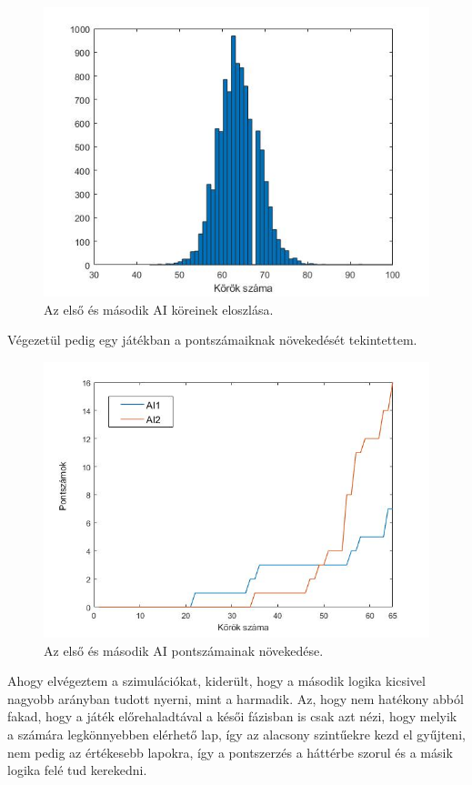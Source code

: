 \begin{figure}[h]
\centering
\includegraphics[scale=0.5]{images/round_number_hist_AI1vsAI2.jpg}
\caption{Az első és második AI köreinek eloszlása.}
\label{fig:rounds1v2}
\end{figure}

Végezetül pedig egy játékban a pontszámaiknak növekedését tekintettem.
\begin{figure}[h]
\centering
\includegraphics[scale=0.5]{images/player_points_AI1vsAI2.jpg}
\caption{Az első és második AI pontszámainak növekedése.}
\label{fig:player_scores1v2}
\end{figure}



Ahogy elvégeztem a szimulációkat, kiderült, hogy a második logika kicsivel nagyobb arányban tudott nyerni, mint a harmadik. Az, hogy nem hatékony abból fakad, hogy a játék előrehaladtával a késői fázisban is csak azt nézi, hogy melyik a számára legkönnyebben elérhető lap, így az alacsony szintűekre kezd el gyűjteni, nem pedig az értékesebb lapokra, így a pontszerzés a háttérbe szorul és a másik logika felé tud kerekedni.

